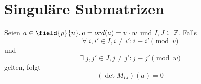 \section{Singuläre Submatrizen}

\begin{lemma} \label{lemma:equal-columns}
    Seien $a \in \field{p}{n}, o = ord(a) = v\cdot w$ und $I,J \subseteq \mathbb{Z}$.
    Falls
    \begin{equation} \label{equation:all-equal}
        \forall \; i, i' \in I, i \neq i': i \equiv i' \pmod v
    \end{equation}
    und
    \begin{equation} \label{equation:two-equal}
        \exists \; j, j' \in J, j \neq j':  j \equiv j' \pmod w
    \end{equation}
    gelten, folgt
    \begin{equation*}
        (\det M_{IJ})(a) = 0
    \end{equation*}
\end{lemma}

